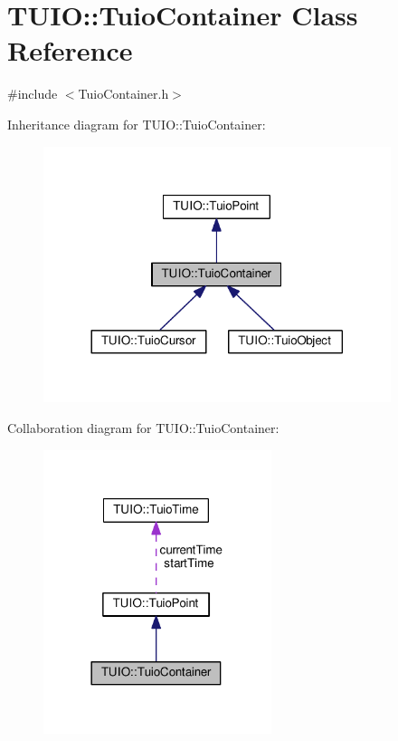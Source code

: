 \hypertarget{class_t_u_i_o_1_1_tuio_container}{}\section{T\+U\+IO\+:\+:Tuio\+Container Class Reference}
\label{class_t_u_i_o_1_1_tuio_container}


{\ttfamily \#include $<$Tuio\+Container.\+h$>$}



Inheritance diagram for T\+U\+IO\+:\+:Tuio\+Container\+:\nopagebreak
\begin{figure}[H]
\begin{center}
\leavevmode
\includegraphics[width=288pt]{class_t_u_i_o_1_1_tuio_container__inherit__graph}
\end{center}
\end{figure}


Collaboration diagram for T\+U\+IO\+:\+:Tuio\+Container\+:\nopagebreak
\begin{figure}[H]
\begin{center}
\leavevmode
\includegraphics[width=189pt]{class_t_u_i_o_1_1_tuio_container__coll__graph}
\end{center}
\end{figure}
